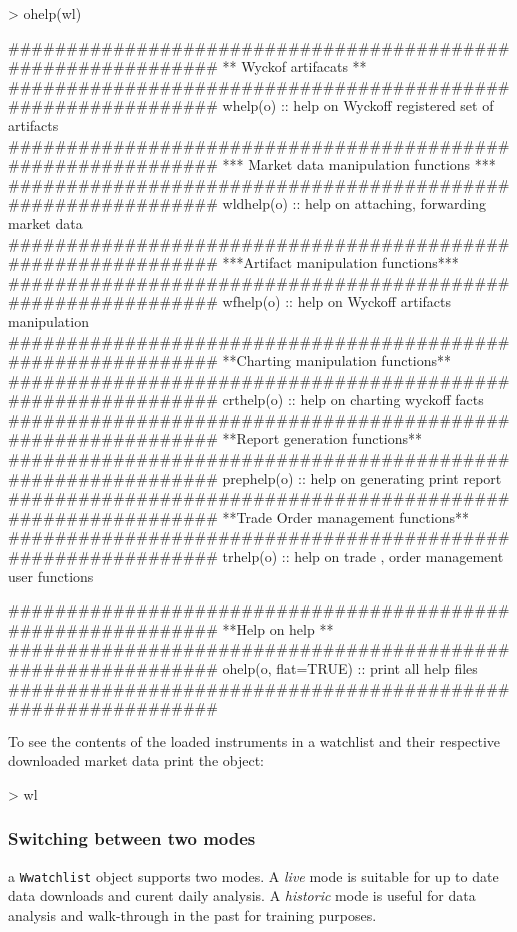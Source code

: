 \documentclass{article}
\begin{document}
\begin{Schunk}
\begin{Sinput}
> ohelp(wl)
\end{Sinput}
\begin{Soutput}
#############################################################
** Wyckof artifacats **
#############################################################
whelp(o) ::	  help on Wyckoff registered set of artifacts
#############################################################
*** Market data manipulation functions  ***
#############################################################
wldhelp(o) ::	  help on attaching, forwarding market data 
#############################################################
***Artifact manipulation functions***
#############################################################
wfhelp(o) ::	  help on Wyckoff artifacts manipulation
#############################################################
**Charting manipulation functions**
#############################################################
crthelp(o) ::	 help on charting wyckoff facts
#############################################################
**Report generation functions**
#############################################################
prephelp(o) ::	 help on generating print report
#############################################################
**Trade Order management functions**
#############################################################
trhelp(o) ::	  help on trade , order management user functions

#############################################################
**Help on help **
#############################################################
ohelp(o, flat=TRUE) ::	  print all help files 
#############################################################
\end{Soutput}
\end{Schunk}
To see the contents of the loaded instruments in a watchlist and their respective downloaded market data print the object:

\begin{Schunk}
\begin{Sinput}
> wl
\end{Sinput}
\end{Schunk}
\subsubsection{Switching between two modes}
a {\tt Wwatchlist} object supports two modes. A {\sl live} mode is suitable for up to date data downloads and curent daily analysis. A {\sl historic} mode is useful for data analysis and walk-through in the past for training purposes.
\end{document}
